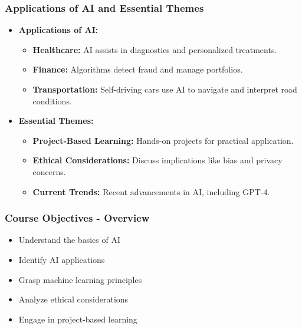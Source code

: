 \documentclass[aspectratio=169]{beamer}
\begin{document}
\begin{frame}[fragile]
    \frametitle{Applications of AI and Essential Themes}
    \begin{itemize}
        \item \textbf{Applications of AI:}
            \begin{itemize}
                \item \textbf{Healthcare:} AI assists in diagnostics and personalized treatments.
                \item \textbf{Finance:} Algorithms detect fraud and manage portfolios.
                \item \textbf{Transportation:} Self-driving cars use AI to navigate and interpret road conditions.
            \end{itemize}    
        \item \textbf{Essential Themes:}
            \begin{itemize}
                \item \textbf{Project-Based Learning:} Hands-on projects for practical application.
                \item \textbf{Ethical Considerations:} Discuss implications like bias and privacy concerns.
                \item \textbf{Current Trends:} Recent advancements in AI, including GPT-4.
            \end{itemize}
    \end{itemize}
\end{frame}

\begin{frame}[fragile]
    \frametitle{Course Objectives - Overview}
    \begin{itemize}
        \item Understand the basics of AI
        \item Identify AI applications
        \item Grasp machine learning principles
        \item Analyze ethical considerations
        \item Engage in project-based learning
    \end{itemize}
\end{frame}
\end{document}
